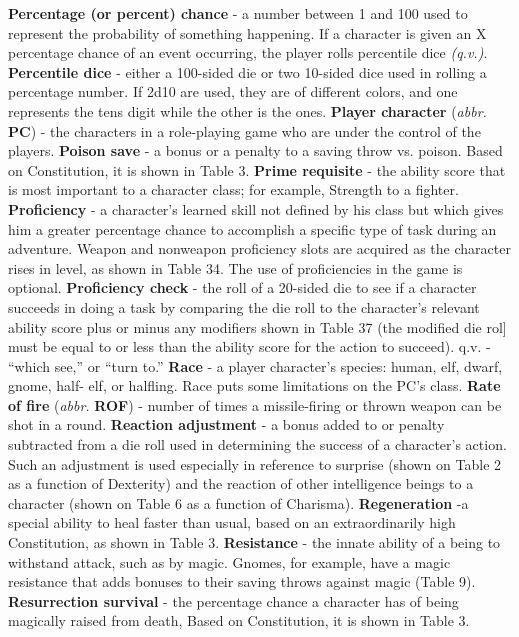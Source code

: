 \documentclass[../main.tex]{subfiles}
\begin{document}
\begin{multicols}{3}
\textbf{Percentage (or percent) chance} - a number between 1 and 100 used to represent the probability of something happening. If a character is given an X percentage chance of an event occurring, the player rolls percentile dice \textit{(q.v.)}.
\textbf{Percentile dice} - either a 100-sided die or two 10-sided dice used in rolling a percentage number. If 2d10 are used, they are of different colors, and one represents the tens digit while the other is the ones.
\textbf{Player character} (\textit{abbr.} \textbf{PC}) - the characters in a role-playing game who are under the control of the players.
\textbf{Poison save} - a bonus or a penalty to a saving throw vs. poison. Based on Constitution, it is shown in Table 3.
\textbf{Prime requisite} - the ability score that is most important to a character class; for example, Strength to a fighter.
\textbf{Proficiency} - a character's learned skill not defined by his class but which gives him a greater percentage chance to accomplish a specific type of task during an adventure. Weapon and nonweapon proficiency slots are acquired as the character rises in level, as shown in Table 34. The use of proficiencies in the game is optional.
\textbf{Proficiency check} - the roll of a 20-sided die to see if a character succeeds in doing a task by comparing the die roll to the character's relevant ability score plus or minus any modifiers shown in Table 37 (the modified die rol] must be equal to or less than the ability score for the action to succeed). q.v. - “which see,” or “turn to.”
\textbf{Race} - a player character's species: human, elf, dwarf, gnome, half- elf, or halfling. Race puts some limitations on the PC's class.
\textbf{Rate of fire} (\textit{abbr.} \textbf{ROF}) - number of times a missile-firing or thrown weapon can be shot in a round.
\textbf{Reaction adjustment} - a bonus added to or penalty subtracted from a die roll used in determining the success of a character's action. Such an adjustment is used especially in reference to surprise (shown on Table 2 as a function of Dexterity) and the reaction of other intelligence beings to a character (shown on Table 6 as a function of Charisma).
\textbf{Regeneration} -a special ability to heal faster than usual, based on an extraordinarily high Constitution, as shown in Table 3.
\textbf{Resistance} - the innate ability of a being to withstand attack, such as by magic. Gnomes, for example, have a magic resistance that adds bonuses to their saving throws against magic (Table 9).
\textbf{Resurrection survival} - the percentage chance a character has of being magically raised from death, Based on Constitution, it is shown in Table 3.

\end{multicols}
\end{document}
